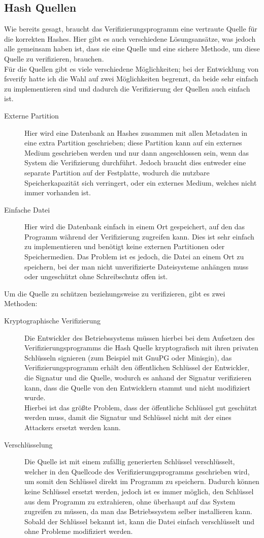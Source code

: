 \subsection{Hash Quellen}
Wie bereits gesagt, braucht das Verifizierungsprogramm eine vertraute Quelle für die korrekten Hashes.
Hier gibt es auch verschiedene Lösungsansätze, was jedoch alle gemeinsam haben ist, dass sie eine Quelle und eine sichere Methode, um diese Quelle zu verifizieren, brauchen.
\\
Für die Quellen gibt es viele verschiedene Möglichkeiten; bei der Entwicklung von fsverify hatte ich die Wahl auf zwei Möglichkeiten begrenzt, da beide sehr einfach zu implementieren sind und dadurch die Verifizierung der Quellen auch einfach ist.
\begin{description}
\item[Externe Partition]
  Hier wird eine Datenbank an Hashes zusammen mit allen Metadaten in eine extra Partition geschrieben; diese Partition kann auf ein externes Medium geschrieben werden und nur dann angeschlossen sein, wenn das System die Verifizierung durchführt.
  Jedoch braucht dies entweder eine separate Partition auf der Festplatte, wodurch die nutzbare Speicherkapazität sich verringert, oder ein externes Medium, welches nicht immer vorhanden ist.
\item[Einfache Datei]
  Hier wird die Datenbank einfach in einem Ort gespeichert, auf den das Programm während der Verifizierung zugreifen kann. Dies ist sehr einfach zu implementieren und benötigt keine externen Partitionen oder Speichermedien. Das Problem ist es jedoch, die Datei an einem Ort zu speichern, bei der man nicht unverifizierte Dateisysteme anhängen muss oder ungeschützt ohne Schreibschutz offen ist.
\end{description}
\pagebreak
Um die Quelle zu schützen beziehungsweise zu verifizieren, gibt es zwei Methoden:
\begin{description}
\item[Kryptographische Verifizierung]
    Die Entwickler des Betriebssystems müssen hierbei bei dem Aufsetzen des Verifizierungsprogramms die Hash Quelle kryptografisch mit ihren privaten Schlüsseln signieren (zum Beispiel mit GnuPG oder Minisgin), das Verifizierungsprogramm erhält den öffentlichen Schlüssel der Entwickler, die Signatur und die Quelle, wodurch es anhand der Signatur verifizieren kann, dass die Quelle von den Entwicklern stammt und nicht modifiziert wurde.\\
  Hierbei ist das größte Problem, dass der öffentliche Schlüssel gut geschützt werden muss, damit die Signatur und Schlüssel nicht mit der eines Attackers ersetzt werden kann.
\item[Verschlüsselung]
  Die Quelle ist mit einem zufällig generierten Schlüssel verschlüsselt, welcher in den Quellcode des Verifizierungsprogramms geschrieben wird, um somit den Schlüssel direkt im Programm zu speichern. Dadurch können keine Schlüssel ersetzt werden, jedoch ist es immer möglich, den Schlüssel aus dem Programm zu extrahieren, ohne überhaupt auf das System zugreifen zu müssen, da man das Betriebssystem selber installieren kann. Sobald der Schlüssel bekannt ist, kann die Datei einfach verschlüsselt und ohne Probleme modifiziert werden.
\end{description}
